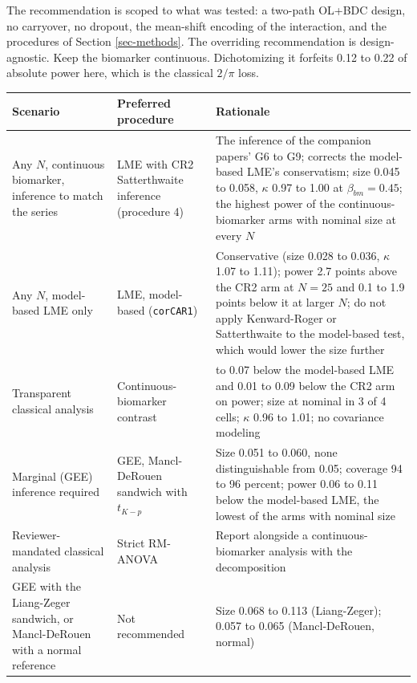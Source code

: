 \documentclass[
  11pt,
]{article}
\newcounter{none} %
\begin{document}
The recommendation is scoped to what was tested: a two-path OL+BDC
design, no carryover, no dropout, the mean-shift encoding of the
interaction, and the procedures of Section \ref{sec-methods}. The
overriding recommendation is design-agnostic. Keep the biomarker
continuous. Dichotomizing it forfeits 0.12 to 0.22 of absolute
power here, which is the classical \(2/\pi\) loss.

{\def\LTcaptype{none} %
\begin{longtable}[]{@{}
  >{\raggedright\arraybackslash}p{}
  >{\raggedright\arraybackslash}p{}
  >{\raggedright\arraybackslash}p{}@{}}
\toprule\noalign{}
\begin{minipage}[b]{\linewidth}\raggedright
Scenario
\end{minipage} & \begin{minipage}[b]{\linewidth}\raggedright
Preferred procedure
\end{minipage} & \begin{minipage}[b]{\linewidth}\raggedright
Rationale
\end{minipage} \\
\midrule\noalign{}
\endhead
\bottomrule\noalign{}
\endlastfoot
Any \(N\), continuous biomarker, inference to match the series & LME with CR2 Satterthwaite inference (procedure 4) & The inference of the companion papers' G6 to G9; corrects the model-based LME's conservatism; size 0.045 to 0.058, \(\kappa\) 0.97 to 1.00 at \(\beta_{bm} = 0.45\); the highest power of the continuous-biomarker arms with nominal size at every \(N\) \\
Any \(N\), model-based LME only & LME, model-based (\texttt{corCAR1}) & Conservative (size 0.028 to 0.036, \(\kappa\) 1.07 to 1.11); power 2.7 points above the CR2 arm at \(N = 25\) and 0.1 to 1.9 points below it at larger \(N\); do not apply Kenward-Roger or Satterthwaite to the model-based test, which would lower the size further \\
Transparent classical analysis & Continuous-biomarker contrast & 0.04 to 0.07 below the model-based LME and 0.01 to 0.09 below the CR2 arm on power; size at nominal in 3 of 4 cells; \(\kappa\) 0.96 to 1.01; no covariance modeling \\
Marginal (GEE) inference required & GEE, Mancl-DeRouen sandwich with \(t_{K-p}\) & Size 0.051 to 0.060, none distinguishable from 0.05; coverage 94 to 96 percent; power 0.06 to 0.11 below the model-based LME, the lowest of the arms with nominal size \\
Reviewer-mandated classical analysis & Strict RM-ANOVA & Report alongside a continuous-biomarker analysis with the decomposition \\
GEE with the Liang-Zeger sandwich, or Mancl-DeRouen with a normal reference & Not recommended & Size 0.068 to 0.113 (Liang-Zeger); 0.057 to 0.065 (Mancl-DeRouen, normal) \\
\end{longtable}
}
\end{document}
